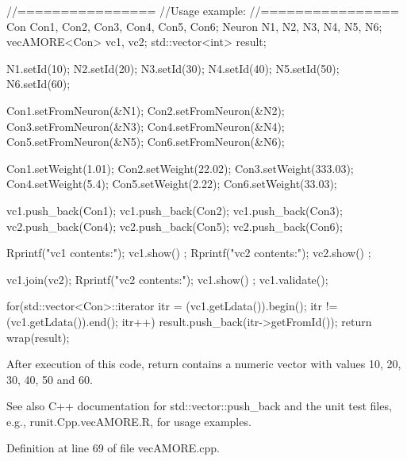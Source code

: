\begin{DoxyCode}
                //================
                //Usage example:
                //================
                Con Con1, Con2, Con3, Con4, Con5, Con6;
                Neuron N1, N2, N3, N4, N5, N6;
                vecAMORE<Con> vc1, vc2;
                std::vector<int> result;

                N1.setId(10);
                N2.setId(20);
                N3.setId(30);
                N4.setId(40);
                N5.setId(50);
                N6.setId(60);

                Con1.setFromNeuron(&N1);
                Con2.setFromNeuron(&N2);
                Con3.setFromNeuron(&N3);
                Con4.setFromNeuron(&N4);
                Con5.setFromNeuron(&N5);
                Con6.setFromNeuron(&N6);

                Con1.setWeight(1.01);
                Con2.setWeight(22.02);
                Con3.setWeight(333.03);
                Con4.setWeight(5.4);
                Con5.setWeight(2.22);
                Con6.setWeight(33.03);

                vc1.push_back(Con1);
                vc1.push_back(Con2);
                vc1.push_back(Con3);
                vc2.push_back(Con4);
                vc2.push_back(Con5);
                vc2.push_back(Con6);

                Rprintf("vc1 contents:");
                vc1.show() ;
                Rprintf("vc2 contents:");
                vc2.show() ;

                vc1.join(vc2);
                Rprintf("vc2 contents:");
                vc1.show() ;
                vc1.validate();

                for(std::vector<Con>::iterator itr = (vc1.getLdata()).begin();   
      itr != (vc1.getLdata()).end();   itr++) { result.push_back(itr->getFromId()); }
                return wrap(result);
\end{DoxyCode}


After execution of this code, return contains a numeric vector with values 10, 20, 30, 40, 50 and 60.

\begin{DoxySeeAlso}{See also}
C++ documentation for std::vector::push\_\-back and the unit test files, e.g., runit.Cpp.vecAMORE.R, for usage examples. 
\end{DoxySeeAlso}


Definition at line 69 of file vecAMORE.cpp.


